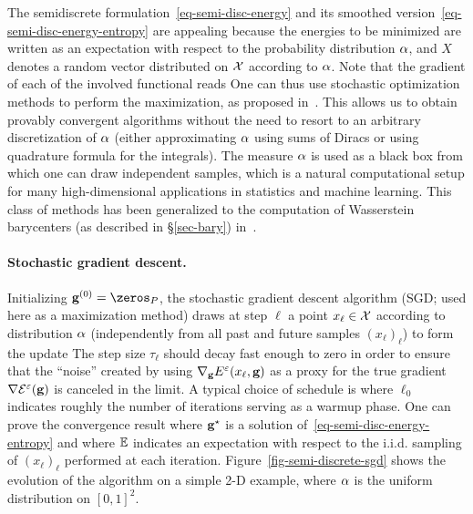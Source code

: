 The semidiscrete formulation~\eqref{eq-semi-disc-energy} and its smoothed version~\eqref{eq-semi-disc-energy-entropy} are appealing because the energies to be minimized are written as an expectation with respect to the probability distribution $\alpha$,
and $X$ denotes a random vector distributed on $\mathcal{X}$ according to $\alpha$.
%
Note that the gradient of each of the involved functional reads
%
One can thus use stochastic optimization methods to perform the maximization, as proposed in~\citet{genevay2016stochastic}.
%
This allows us to obtain provably convergent algorithms without the need to resort to an arbitrary discretization of $\alpha$ (either approximating $\alpha$ using sums of Diracs or using quadrature formula for the integrals).
%
The measure $\alpha$ is used as a black box from which one can draw independent samples, which is a natural computational setup for many high-dimensional applications in statistics and machine learning. 
%
This class of methods has been generalized to the computation of Wasserstein barycenters (as described in \S\ref{sec-bary}) in~\citep{staib2017parallel}.

\paragraph{Stochastic gradient descent.}

Initializing $\gD^{(0)} = \zeros_{P}$, the stochastic gradient descent algorithm (SGD; used here as a maximization method) draws at step $\ell$ a point $x_\ell \in \mathcal{X}$ according to distribution $\alpha$ (independently from all past and future samples $(x_\ell)_\ell$) to form the update
The step size $\tau_\ell$ should decay fast enough to zero in order to ensure that the ``noise'' created by using  $\nabla_{\mathrm{\textbf{g}}} E^\varepsilon(x_\ell,\mathrm{\textbf{g}})$ as a proxy for the true gradient $\nabla \mathcal{E}^\varepsilon(\mathrm{\textbf{g}})$ is canceled in the limit. 
%
A typical choice of schedule is 
where $\ell_0$ indicates roughly the number of iterations serving as a warmup phase.
%
One can prove the convergence result
where $\mathrm{\textbf{g}}^\star$ is a solution of~\eqref{eq-semi-disc-energy-entropy} and where $\mathbb{E}$ indicates an expectation with respect to the i.i.d. sampling of $(x_\ell)_\ell$ performed at each iteration.
%
Figure~\ref{fig-semi-discrete-sgd} shows the evolution of the algorithm on a simple 2-D example, where $\alpha$ is the uniform distribution on $[0,1]^2$. 


